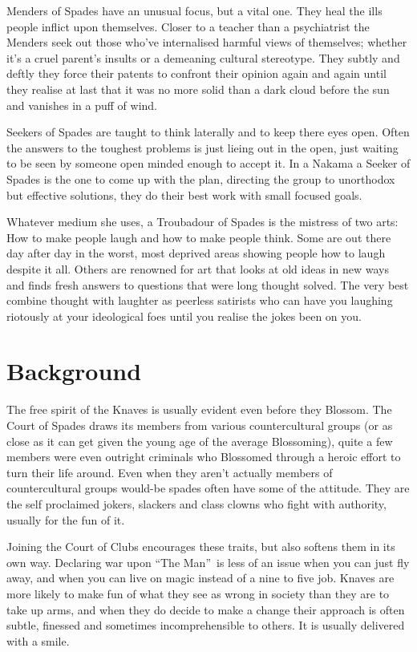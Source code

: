 Menders of Spades have an unusual focus, but a vital one. They heal the ills people inflict upon themselves. Closer to a teacher than a psychiatrist the Menders seek out those who've internalised harmful views of themselves; whether it's a cruel parent's insults or a demeaning cultural stereotype. They subtly and deftly they force their patents to confront their opinion again and again until they realise at last that it was no more solid than a dark cloud before the sun and vanishes in a puff of wind.

Seekers of Spades are taught to think laterally and to keep there eyes open. Often the answers to the toughest problems is just lieing out in the open, just waiting to be seen by someone open minded enough to accept it. In a Nakama a Seeker of Spades is the one to come up with the plan, directing the group to unorthodox but effective solutions, they do their best work with small focused goals. 

Whatever medium she uses, a Troubadour of Spades is the mistress of two arts: How to make people laugh and how to make people think. Some are out there day after day in the worst, most deprived areas showing people how to laugh despite it all. Others are renowned for art that looks at old ideas in new ways and finds fresh answers to questions that were long thought solved. The very best combine thought with laughter as peerless satirists who can have you laughing riotously at your ideological foes until you realise the jokes been on you. 

\section*{Background}

The free spirit of the Knaves is usually evident even before they Blossom. The Court of Spades draws its members from various countercultural groups (or as close as it can get given the young age of the average Blossoming), quite a few members were even outright criminals who Blossomed through a heroic effort to turn their life around.  Even when they aren't actually members of countercultural groups would-be spades often have some of the attitude. They are the self proclaimed jokers, slackers and class clowns who fight with authority, usually for the fun of it. 

Joining the Court of Clubs encourages these traits, but also softens them in its own way. Declaring war upon \textquotedblleft The Man\textquotedblright\, is less of an issue when you can just fly away, and when you can live on magic instead of a nine to five job. Knaves are more likely to make fun of what they see as wrong in society than they are to take up arms, and when they do decide to make a change their approach is often subtle, finessed and sometimes incomprehensible to others. It is usually delivered with a smile.

